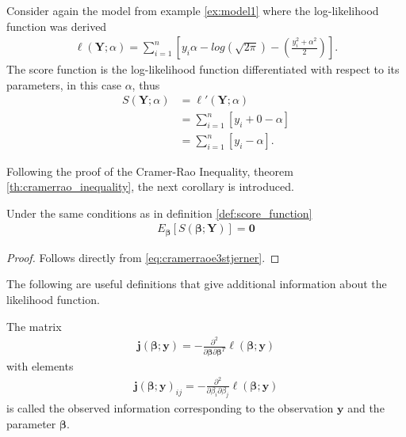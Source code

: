 \begin{example}
Consider again the model from example \ref{ex:model1} where the log-likelihood function was derived
\begin{align*}
   \ell(\textbf{Y};\alpha) = \sum_{i = 1}^n \left[y_i \alpha - log\left( \sqrt{2 \pi}\right) - \left( \frac{y_i^2 + \alpha^2}{2} \right) \right].
\end{align*}
The score function is the log-likelihood function differentiated with respect to its parameters, in this case $\alpha$, thus
\begin{align*}
    S\left( \textbf{Y}; \alpha \right) &= \ell'(\textbf{Y}; \alpha)\\
    &= \sum_{i=1}^n \left[ y_i + 0 - \alpha \right]\\
    &= \sum_{i=1}^n \left[ y_i - \alpha \right].
\end{align*}
\end{example}
Following the proof of the Cramer-Rao Inequality, theorem \ref{th:cramerrao_inequality}, the next corollary is introduced.
\begin{corollary}
Under the same conditions as in definition \ref{def:score_function}
\begin{align*}
    E_{\boldsymbol{\beta}}[S(\boldsymbol{\beta}; \textbf{Y})] = \textbf{0}
\end{align*}
\end{corollary}
\begin{proof}
Follows directly from \eqref{eq:cramerraoe3stjerner}.
\end{proof}
The following are useful definitions that give additional information about the likelihood function.
\begin{definition} 
\label{def:observed_information}
The matrix
\begin{align} \label{eq:Observed_information}
    \textbf{j}(\boldsymbol{\beta};\textbf{y}) = - \frac{\partial^2}{\partial \boldsymbol{\beta} \partial \boldsymbol{\beta}^T} \ell(\boldsymbol{\beta}; \textbf{y})
\end{align}
with elements
\begin{align*}
    \textbf{j}(\boldsymbol{\beta};\textbf{y})_{ij} = - \frac{\partial^2}{\partial \beta_i \partial \beta_j} \ell(\boldsymbol{\beta}; \textbf{y})
\end{align*}
is called the observed information corresponding to the observation $\textbf{y}$ and the parameter $\boldsymbol{\beta}$.
\end{definition}

